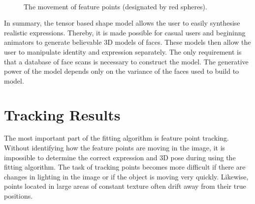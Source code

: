 \documentclass[11pt,a4paper,twoside]{report}
\begin{document}
\begin{figure}[H]
\centering
{}\\

\caption{The movement of feature points (designated by red spheres).}\label{fg:featureinter}
\end{figure}

In summary, the tensor based shape model allows the user to easily synthesise
realistic expressions. Thereby, it is made possible for casual users and
begininng animators to generate believable 3D models of faces. These models then
allow the user to manipulate identity and expression separately. The only
requirement is that a database of face scans is necessary to construct the
model. The generative power of the model depends only on the variance of
the faces used to build to model. 


\section{Tracking Results}
The most important part of the fitting algorithm is feature point
tracking. Without identifying how the feature points are moving in the image, it
is impossible to determine the correct expression and 3D pose during using the
fitting algorithm. The task of tracking points becomes more difficult if there
are changes in lighting in the image or if the object is moving very
quickly. Likewise, points located in large areas of constant texture often drift
away from their true positions. 
\end{document}
